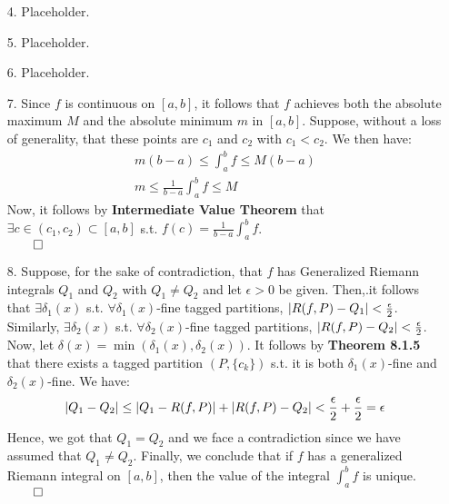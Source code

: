 \documentclass[11pt]{article}
\DeclarePairedDelimiter\abs{\lvert}{\rvert}%
\begin{document}
\begin{itemize}
    \item[4.]
        Placeholder.

    \item[5.]
        Placeholder.

    \item[6.]
        Placeholder.

    \item[7.]
        Since $f$ is continuous on $[a, b]$, it follows that $f$ achieves both
        the absolute maximum $M$ and the absolute minimum $m$ in $[a, b]$.
        Suppose, without a loss of generality, that these points are $c_1$ and
        $c_2$ with $c_1 < c_2$. We then have:
        \begin{align}
            m (b - a) \leq \int_a^b f \leq M (b - a)\\
            m \leq \frac{1}{b - a} \int_a^b f \leq M
        \end{align}
        Now, it follows by \textbf{Intermediate Value Theorem} that $\exists c
        \in (c_1, c_2) \subset [a, b]$ s.t. $f(c) = \frac{1}{b - a} \int_a^b
        f$.\\
        $\qed$

    \item[8.]
        Suppose, for the sake of contradiction, that $f$ has Generalized
        Riemann integrals $Q_1$ and $Q_2$ with $Q_1 \neq Q_2$ and let $\epsilon
        > 0$ be given. Then,.it follows that $\exists \delta_1(x)$ s.t.
        $\forall \delta_1(x)$-fine tagged partitions, $\abs{R(f, P) - Q_1} <
        \frac{\epsilon}{2}$. Similarly, $\exists \delta_2(x)$ s.t. $\forall
        \delta_2(x)$-fine tagged partitions, $\abs{R(f, P) - Q_2} <
        \frac{\epsilon}{2}$. Now, let $\delta(x) = \min (\delta_1(x),
        \delta_2(x))$. It follows by \textbf{Theorem 8.1.5} that there exists a
        tagged partition $(P, \{c_k\})$ s.t. it is both $\delta_1(x)$-fine and
        $\delta_2(x)$-fine. We have:
        \begin{equation*}
            \abs{Q_1 - Q_2} \leq \abs{Q_1 - R(f, P)} + \abs{R(f, P) - Q_2}
                            < \frac{\epsilon}{2} + \frac{\epsilon}{2}
                            = \epsilon
        \end{equation*}
        Hence, we got that $Q_1 = Q_2$ and we face a contradiction since we
        have assumed that $Q_1 \neq Q_2$. Finally, we conclude that if $f$ has
        a generalized Riemann integral on $[a, b]$, then the value of the
        integral $\int_a^b f$ is unique.\\
        $\qed$


\end{itemize}
\end{document}
